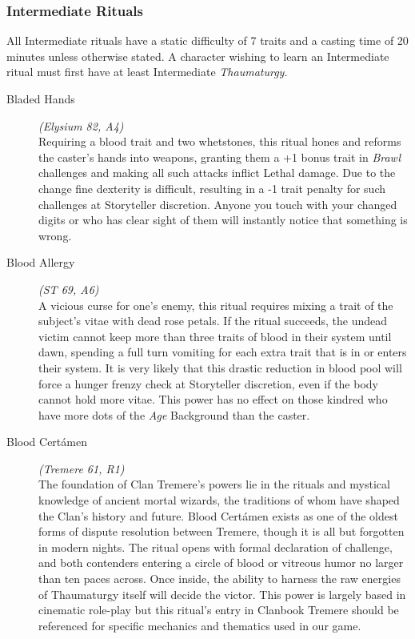 \subsubsection{Intermediate Rituals}
All Intermediate rituals have a static difficulty of 7 traits and a casting time of 20 minutes unless otherwise stated.  
A character wishing to learn an Intermediate ritual must first have at least Intermediate \emph{Thaumaturgy}. \\

\begin{description}

	\item[Bladed Hands] \emph{(Elysium 82, A4)} \hfill \\
	Requiring a blood trait and two whetstones, this ritual hones and reforms the caster's hands into weapons, granting them a +1 
	bonus trait in \emph{Brawl} challenges and making all such attacks inflict Lethal damage.  Due to the change fine dexterity 
	is difficult, resulting in a -1 trait penalty for such challenges at Storyteller discretion.  Anyone you touch with your 
	changed digits or who has clear sight of them will instantly notice that something is wrong. \\

	\item[Blood Allergy] \emph{(ST 69, A6)} \hfill \\
	A vicious curse for one's enemy, this ritual requires mixing a trait of the subject's vitae with dead rose petals.  If the 
	ritual succeeds, the undead victim cannot keep more than three traits of blood in their system until dawn, spending a full 
	turn vomiting for each extra trait that is in or enters their system.  It is very likely that this drastic reduction in 
	blood pool will force a hunger frenzy check at Storyteller discretion, even if the body cannot hold more vitae.  This power 
	has no effect on those kindred who have more dots of the \emph{Age} Background than the caster. \\

	\item[Blood Cert\'{a}men] \emph{(Tremere 61, R1)} \hfill \\
	The foundation of Clan Tremere's powers lie in the rituals and mystical knowledge of ancient mortal wizards, the traditions 
	of whom have shaped the Clan's history and future.  Blood Cert\'{a}men exists as one of the oldest forms of dispute resolution 
	between Tremere, though it is all but forgotten in modern nights.  The ritual opens with formal declaration of challenge, 
	and both contenders entering a circle of blood or vitreous humor no larger than ten paces across.  Once inside, the ability 
	to harness the raw energies of Thaumaturgy itself will decide the victor.  This power is largely based in cinematic 
	role-play but this ritual's entry in Clanbook Tremere should be referenced for specific mechanics and thematics used in our 
	game. \\


\end{description}
